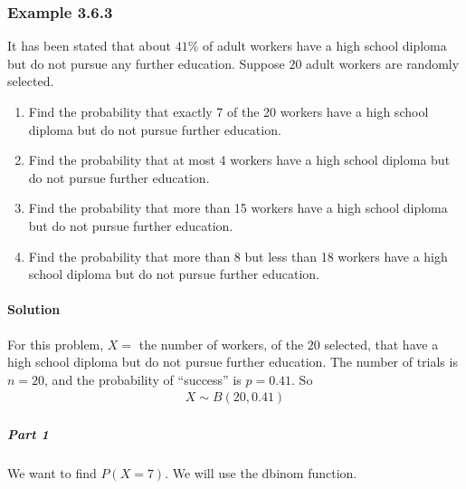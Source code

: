 \documentclass[letterpaper,10pt,english]{jupyterBook}
\begin{document}
\subsubsection{Example 3.6.3}
\label{\detokenize{Ch3 Probability/3.6 The Binomial Distribution:example-3-6-3}}
\sphinxAtStartPar
It has been stated that about \(41\%\) of adult workers have a high school diploma but do not pursue any further education. Suppose \(20\) adult workers are randomly selected.
\begin{enumerate}
%
\item {} 
\sphinxAtStartPar
Find the probability that exactly 7 of the 20 workers have a high school diploma but do not pursue further education.

\item {} 
\sphinxAtStartPar
Find the probability that at most 4 workers have a high school diploma but do not pursue further education.

\item {} 
\sphinxAtStartPar
Find the probability that more than 15 workers have a high school diploma but do not pursue further education.

\item {} 
\sphinxAtStartPar
Find the probability that more than 8 but less than 18 workers have a high school diploma but do not pursue further education.

\end{enumerate}


\paragraph{Solution}
\label{\detokenize{Ch3 Probability/3.6 The Binomial Distribution:id3}}
\sphinxAtStartPar
For this problem, \(X =\) the number of workers, of the \(20\) selected, that have a high school diploma but do not pursue further education. The number of trials is \(n = 20\), and the probability of “success” is \(p = 0.41\). So
\begin{equation*}
\begin{split} X \sim B(20, 0.41) \end{split}
\end{equation*}

\subparagraph{Part 1}
\label{\detokenize{Ch3 Probability/3.6 The Binomial Distribution:id4}}
\sphinxAtStartPar
We want to find \(P(X = 7)\). We will use the dbinom function.
\end{document}

